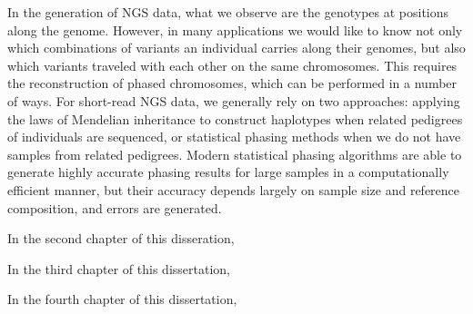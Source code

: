 In the generation of NGS data, what we observe are the genotypes at positions along the genome. However, in many applications we would like to know not only which combinations of variants an individual carries along their genomes, but also which variants traveled with each other on the same chromosomes. This requires the reconstruction of phased chromosomes, which can be performed in a number of ways. For short-read NGS data, we generally rely on two approaches: applying the laws of Mendelian inheritance to construct haplotypes when related pedigrees of individuals are sequenced, or statistical phasing methods when we do not have samples from related pedigrees. Modern statistical phasing algorithms \citep{Browning2021, Hofmeister2023, Loh2016} are able to generate highly accurate phasing results for large samples in a computationally efficient manner, but their accuracy depends largely on sample size and reference composition, and errors are generated. 

In the second chapter of this disseration,

In the third chapter of this dissertation,

In the fourth chapter of this dissertation,